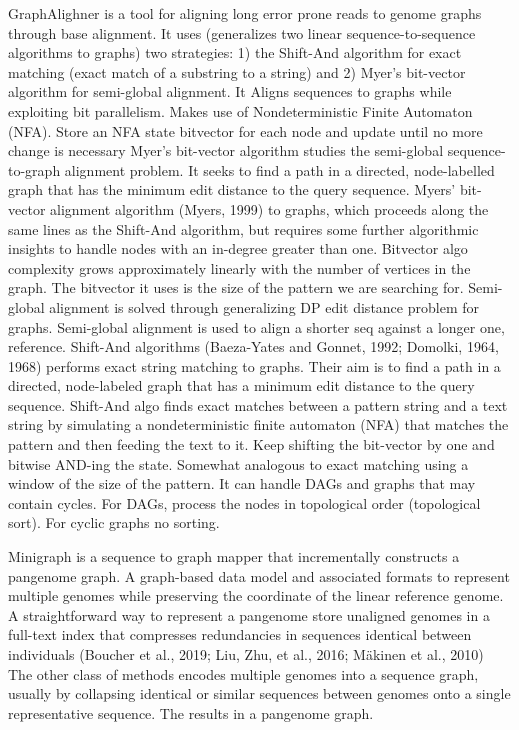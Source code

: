 \documentclass[a4paper]{article}
\begin{document}
GraphAlighner \cite{rautiainenBitparallelSequencetographAlignment2019} is a tool 
for aligning long error prone reads to genome graphs through base alignment.
It uses (generalizes two linear sequence-to-sequence algorithms to graphs) two 
strategies: 1) the Shift-And algorithm for exact matching (exact match of a
substring to a string) and 2) Myer’s bit-vector algorithm for semi-global
alignment. It Aligns sequences to graphs while exploiting bit parallelism.
Makes use of Nondeterministic Finite Automaton (NFA).
Store an NFA state bitvector for each node and update until no more change is
necessary Myer’s bit-vector algorithm studies the semi-global sequence-to-graph
alignment problem.
It seeks to find a path in a directed, node-labelled graph that has the
minimum edit distance to the query sequence. Myers’ bit-vector alignment 
algorithm (Myers, 1999) to graphs, which proceeds along the same lines as the
Shift-And algorithm, but requires some further algorithmic insights to handle 
nodes with an in-degree greater than one. Bitvector algo complexity grows 
approximately linearly with the number of vertices in the graph. The bitvector 
it uses is the size of the pattern we are searching for. Semi-global alignment 
is solved through generalizing DP edit distance problem for graphs. Semi-global 
alignment is used to align a shorter seq against a longer one, reference.
Shift-And algorithms (Baeza-Yates and Gonnet, 1992; Domolki, 1964, 1968) 
performs exact string matching to graphs. 
Their aim is to find a path in a directed, node-labeled graph that has a minimum
edit distance \cite{levenshteinBinaryCodesCapable1966a} to the query sequence. 
Shift-And algo finds exact matches between a pattern string and a text string by
simulating a nondeterministic finite automaton (NFA) that matches the pattern 
and then feeding the text to it.
Keep shifting the bit-vector by one and bitwise AND-ing the state. 
Somewhat analogous to exact matching using a window of the size of the pattern.
It can handle DAGs and  graphs that may contain cycles. For DAGs, process the 
nodes in topological order (topological sort). For cyclic graphs no sorting.

Minigraph \cite{liDesignConstructionReference2020} is a sequence to graph mapper
that incrementally constructs a pangenome graph.
A graph-based data model and associated formats to represent multiple genomes 
while preserving the coordinate of the linear reference genome. 
A straightforward way to represent a pangenome store unaligned genomes in a
full-text index that compresses redundancies in sequences identical between 
individuals (Boucher et al., 2019; Liu, Zhu, et al., 2016; Mäkinen et al., 2010) 		
The other class of methods encodes multiple genomes into a sequence graph, 
usually by collapsing identical or similar sequences between genomes onto a 
single representative sequence. The results in a pangenome graph.
\end{document}
